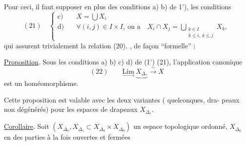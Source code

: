 Pour ceci, il faut supposer en plus des
conditions a) b) de 1'), les conditions
\[
(21)\quad\left\{\begin{aligned}
\text{c)}\quad&X=\bigcup X_i\\
\text{d)}\quad&\forall(i,j)\in I\times I,\ \text{on a}\quad
X_i\cap X_j=\bigcup_{\substack{k\in I\\k\leq i,\ k\leq j}}X_k,
\end{aligned}\right.
\]
qui assurent trivialement la relation (20).
, de façon  ``formelle'' :

\uline{Proposition}. Sous les conditions a) b) c) d)
de (1') (21), l'application canonique
\[
(22)\qquad\underset{\longrightarrow}{\mathrm{Lim}}\ \underbrace{X_{\Delta_*}}\xrightarrow{\sim}X
\]
est un homéomorphisme.

Cette proposition est valable avec les
deux variantes ( quelconques, dra-
peaux non dégénérés) pour les
espaces de drapeaux $X_{\Delta_r}$.

\uline{Corollaire}. Soit $(X_{\Delta_0},X_{\Delta_1}\subset X_{\Delta_0}\times X_{\Delta_0})$
un espace topologique ordonné, 
 $X_{\Delta_0}$ en des parties à la fois ouvertes et fermées
